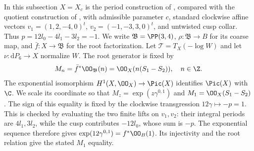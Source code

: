 In this subsection $X=X_c$ is the period construction of \cite{AC26}, compared with the quotient construction of \cite{Engel2026}, with admissible parameter $c$, standard clockwise affine vectors
$v_1=(1,2,-4,0)^t$, $v_2=(-1,-3,3,0)^t$, and untwisted cusp collar. Thus $p=12l_0-4l_1-3l_2=-1$. We write $\mathfrak B=\PP(3,4)$, $\rho:\mathfrak B\to B$ for its coarse map, and $\bar f:X\to\mathfrak B$ for the root factorization. Let $\mathcal T=T_X(-\log W)$ and let $\nu:\mathrm dP_6\to X$ normalize $W$. The root generator is fixed by
\[
 M_n=\bar f^*\OO_{\mathfrak B}(n)
     =\OO_X(n(S_1-S_2)),\quad n\in\Z.
\]
The exponential isomorphism $H^1(X,\OO_X)\to\Pic(X)$ identifies $\Pic(X)$ with $\C$. We scale its coordinate so that $M_z=\exp(z\gamma^{0,1})$ and $M_1=\OO_X(S_1-S_2)$. The sign of this equality is fixed by the clockwise transgression $12\gamma\mapsto-p=1$. This is checked by evaluating the two finite lifts on $v_1,v_2$: their integral periods are $4l_1,3l_2$, while the cusp contributes $-12l_0$, whose sum is $-p$. The exponential sequence therefore gives $\exp(12\gamma^{0,1})=f^*\OO_B(1)$. Its injectivity and the root relation give the stated $M_1$ equality.

